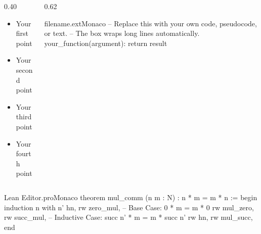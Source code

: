 \documentclass{retrobeamer}
\begin{document}
\begin{frame}[fragile,t]
  \begin{columns}[T]
    \begin{column}{0.40\textwidth}
      \begin{itemize}
        \item \Large Your first point
        \item \Large Your second point
        \item \Large Your third point
        \item \Large Your fourth point
      \end{itemize}
    \end{column}
    \begin{column}{0.62\textwidth}
\begin{macwindow}{filename.ext}{Monaco}
-- Replace this with your own code, pseudocode, or text.
-- The box wraps long lines automatically.
your_function(argument):
    return result
\end{macwindow}
    \end{column}
  \end{columns}
\end{frame}

\begin{frame}[fragile,t]
  \begin{center}
\begin{macwindow}{Lean Editor.pro}{Monaco}
theorem mul_comm (n m : N) : n * m = m * n :=
begin
  induction n with n' hn,
    rw zero_mul,      -- Base Case: 0 * m = m * 0
    rw mul_zero,
    rw succ_mul,      -- Inductive Case: succ n' * m = m * succ n'
    rw hn,
    rw mul_succ,
end
\end{macwindow}
  \end{center}
\end{frame}
\end{document}
